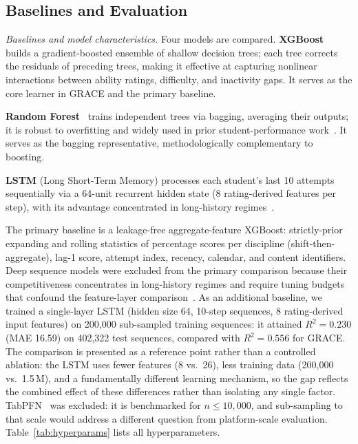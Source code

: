 \documentclass[11pt]{article}
\begin{document}
\subsection{Baselines and Evaluation}

\textit{Baselines and model characteristics.}\quad
Four models are compared.
\textbf{XGBoost}~\cite{chen2016} builds a gradient-boosted ensemble of shallow decision trees;
each tree corrects the residuals of preceding trees, making it effective at capturing
nonlinear interactions between ability ratings, difficulty, and inactivity gaps.
It serves as the core learner in GRACE and the primary baseline.

\textbf{Random Forest}~\cite{breiman2001} trains independent trees via bagging, averaging
their outputs; it is robust to overfitting and widely used in prior student-performance
work~\cite{fernandez2014}.
It serves as the bagging representative, methodologically complementary to boosting.

\begin{sloppypar}
\textbf{LSTM} (Long Short-Term Memory) processes each student's last 10 attempts
sequentially via a 64-unit recurrent hidden state (8 rating-derived features per step),
with its advantage concentrated in long-history regimes~\cite{piech2015,khajah2016,gervet2020,liu2021}.
\end{sloppypar}

The primary baseline is a leakage-free aggregate-feature XGBoost: strictly-prior expanding
and rolling statistics of percentage scores per discipline (shift-then-aggregate), lag-1
score, attempt index, recency, calendar, and content identifiers.
Deep sequence models were excluded from the primary comparison because their
competitiveness concentrates in long-history regimes and require tuning budgets
that confound the feature-layer comparison~\cite{khajah2016,gervet2020,liu2021}.
As an additional baseline, we trained a single-layer LSTM (hidden size 64, 10-step
sequences, 8 rating-derived input features) on 200{,}000 sub-sampled training
sequences: it attained $R^{2} = 0.230$ (MAE 16.59) on 402{,}322 test sequences,
compared with $R^{2} = 0.556$ for GRACE.
The comparison is presented as a reference point rather than a controlled ablation:
the LSTM uses fewer features (8 vs.\ 26), less training data (200{,}000 vs.\ 1.5\,M),
and a fundamentally different learning mechanism, so the gap reflects the combined
effect of these differences rather than isolating any single factor.
TabPFN~\cite{hollmann2025} was excluded: it is benchmarked for $n \le 10{,}000$,
and sub-sampling to that scale would address a different question from platform-scale evaluation.
Table~\ref{tab:hyperparams} lists all hyperparameters.
\end{document}
